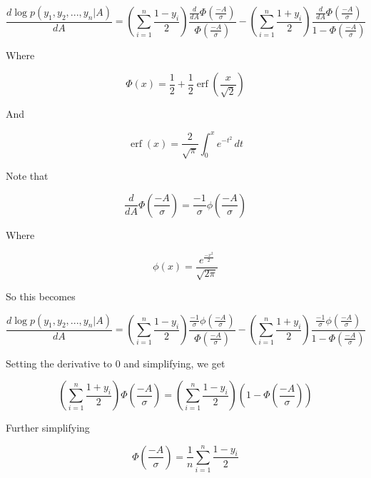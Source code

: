 \documentclass{amsart}
\DeclareMathOperator\erf{erf}
\begin{document}
\begin{equation}
\frac{d\log p(y_1, y_2, ..., y_n | A)}{dA} = \left( \sum_{i=1}^{n}\frac{1-y_i}{2} \right)  \frac{\frac{d}{dA} \Phi(\frac{-A}{\sigma})}{\Phi(\frac{-A}{\sigma})} - \left( \sum_{i=1}^{n}\frac{1+y_i}{2} \right)  \frac{\frac{d}{dA} \Phi(\frac{-A}{\sigma})}{1-\Phi(\frac{-A}{\sigma})}
\end{equation}

Where

\begin{equation}
\Phi(x) = \frac{1}{2} + \frac{1}{2}\erf(\frac{x}{\sqrt{2}})
\end{equation}

And

\begin{equation}
 \erf(x) = \frac{2}{\sqrt{\pi}} \int_{0}^{x}e^{-t^{2}}\, dt
\end{equation}

Note that

\begin{equation}
\frac{d}{dA}\Phi(\frac{-A}{\sigma}) = \frac{-1}{\sigma} \phi(\frac{-A}{\sigma})
\end{equation}

Where

\begin{equation}
\phi(x) = \frac{e^\frac{-x^2}{2}}{\sqrt{2\pi}}
\end{equation}

So this becomes

\begin{equation}
\frac{d\log p(y_1, y_2, ..., y_n | A)}{dA} = \left( \sum_{i=1}^{n}\frac{1-y_i}{2} \right)  \frac{\frac{-1}{\sigma} \phi(\frac{-A}{\sigma})}{\Phi(\frac{-A}{\sigma})} - \left( \sum_{i=1}^{n}\frac{1+y_i}{2} \right)  \frac{\frac{-1}{\sigma} \phi(\frac{-A}{\sigma})}{1-\Phi(\frac{-A}{\sigma})}
\end{equation}

Setting the derivative to 0 and simplifying, we get

\begin{equation}
\left( \sum_{i=1}^{n}\frac{1+y_i}{2} \right) \Phi(\frac{-A}{\sigma}) = \left( \sum_{i=1}^{n}\frac{1-y_i}{2} \right) \left( 1-\Phi(\frac{-A}{\sigma}) \right)
\end{equation}

Further simplifying

\begin{equation}
\Phi(\frac{-A}{\sigma}) = \frac{1}{n}\sum_{i=1}^{n}\frac{1-y_i}{2}
\end{equation}
\end{document}
